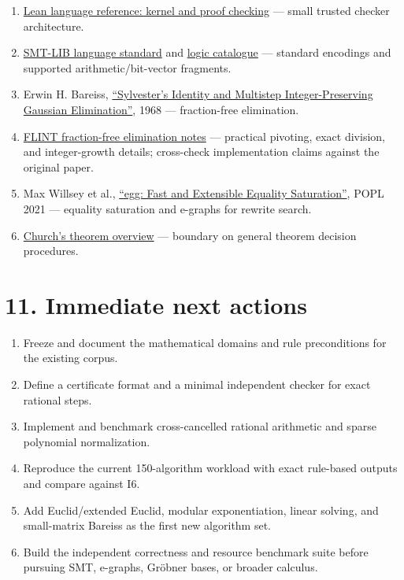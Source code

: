 \documentclass[
  10pt,
]{article}
\providecommand{\tightlist}{%
  \setlength{\itemsep}{0pt}\setlength{\parskip}{0pt}}
\begin{document}
\begin{enumerate}
\def\labelenumi{\arabic{enumi}.}
\tightlist
\item
  \href{https://lean-lang.org/doc/reference/latest/Elaboration-and-Compilation/}{Lean
  language reference: kernel and proof checking} --- small trusted
  checker architecture.
\item
  \href{https://smt-lib.org/language.shtml}{SMT-LIB language standard}
  and \href{https://smt-lib.org/logics.shtml}{logic catalogue} ---
  standard encodings and supported arithmetic/bit-vector fragments.
\item
  Erwin H. Bareiss,
  \href{https://doi.org/10.1090/S0025-5718-1968-0226829-0}{``Sylvester's
  Identity and Multistep Integer-Preserving Gaussian Elimination''},
  1968 --- fraction-free elimination.
\item
  \href{https://flintlib.org/doc/algorithms/linear-algebra/fraction-free.html}{FLINT
  fraction-free elimination notes} --- practical pivoting, exact
  division, and integer-growth details; cross-check implementation
  claims against the original paper.
\item
  Max Willsey et al., \href{https://doi.org/10.1145/3434304}{``egg: Fast
  and Extensible Equality Saturation''}, POPL 2021 --- equality
  saturation and e-graphs for rewrite search.
\item
  \href{https://plato.stanford.edu/entries/goedel-incompleteness/}{Church's
  theorem overview} --- boundary on general theorem decision procedures.
\end{enumerate}

\section{11. Immediate next actions}\label{immediate-next-actions}

\begin{enumerate}
\def\labelenumi{\arabic{enumi}.}
\tightlist
\item
  Freeze and document the mathematical domains and rule preconditions
  for the existing corpus.
\item
  Define a certificate format and a minimal independent checker for
  exact rational steps.
\item
  Implement and benchmark cross-cancelled rational arithmetic and sparse
  polynomial normalization.
\item
  Reproduce the current 150-algorithm workload with exact rule-based
  outputs and compare against I6.
\item
  Add Euclid/extended Euclid, modular exponentiation, linear solving,
  and small-matrix Bareiss as the first new algorithm set.
\item
  Build the independent correctness and resource benchmark suite before
  pursuing SMT, e-graphs, Gröbner bases, or broader calculus.
\end{enumerate}
\end{document}
